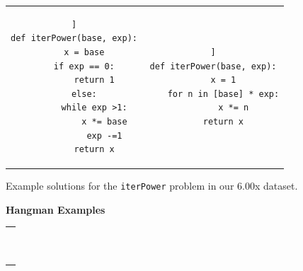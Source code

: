 \documentclass[12pt,twoside]{mitthesis}
\newcommand \codevar[1]{\texttt{#1}}
\begin{document}
{{{{{{{{{{\begin{figure}
\begin{tabular}{c c}
\begin{minipage}{0.4\linewidth}
\begin{lstlisting}]
def iterPower(base, exp):
    x = base
    if exp == 0:
        return 1
    else:
        while exp >1:
            x *= base
            exp -=1
        return x
\end{lstlisting}
\end{minipage}
&
\begin{minipage}{0.4\linewidth}
\begin{lstlisting}]
def iterPower(base, exp):
    x = 1
    for n in [base] * exp:
        x *= n
    return x
\end{lstlisting}
\end{minipage}

\end{tabular}
\caption{Example solutions for the \codevar{iterPower} problem in our 6.00x dataset.}
\label{ipexamples}
\end{figure}


\begin{figure}
{\bf Hangman Examples} \\
\begin{tabular}{c}
\begin{minipage}{1.0\linewidth}
\begin{lstlisting}[]


\end{lstlisting}
\end{minipage}
\end{tabular}
\end{figure}}}}}}}}}}}
\end{document}
